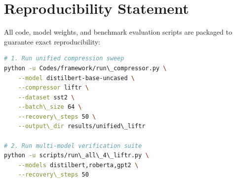 \section{Reproducibility Statement}
All code, model weights, and benchmark evaluation scripts are packaged to guarantee exact reproducibility:
\begin{lstlisting}[language=bash]
# 1. Run unified compression sweep
python -u Codes/framework/run\_compressor.py \
    --model distilbert-base-uncased \
    --compressor liftr \
    --dataset sst2 \
    --batch\_size 64 \
    --recovery\_steps 50 \
    --output\_dir results/unified\_liftr

# 2. Run multi-model verification suite
python -u scripts/run\_all\_4\_liftr.py \
    --models distilbert,roberta,gpt2 \
    --recovery\_steps 50
\end{lstlisting}
